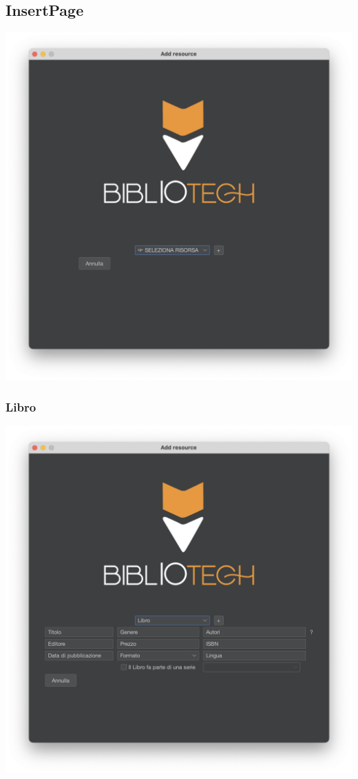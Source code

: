 \subsection{InsertPage}
\includegraphics[scale=0.25, center]{Immagini/Schermate/Insert/InserisciRisorsaPage.png}

\subsubsection{Libro}
\includegraphics[scale=0.25, center]{Immagini/Schermate/Insert/InserisciRisorsaPage-Libro.png}
